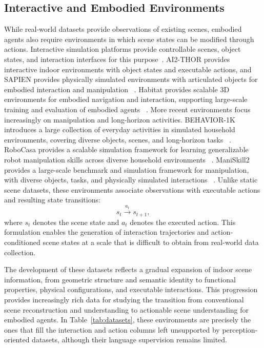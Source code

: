 \documentclass{SCIS2026}
\begin{document}
\subsection{Interactive and Embodied Environments}
\label{subsec:interactive_embodied_datasets}
While real-world datasets provide observations of existing scenes, embodied agents also require environments in which scene states can be modified through actions. Interactive simulation platforms provide controllable scenes, object states, and interaction interfaces for this purpose~\cite{gan2021threedworld,li2020igibson}. AI2-THOR provides interactive indoor environments with object states and executable actions, and SAPIEN provides physically simulated environments with articulated objects for embodied interaction and manipulation
~\cite{kolve2017ai2,xiang2020sapien}. Habitat provides scalable 3D environments for embodied navigation and interaction, supporting large-scale training and evaluation of embodied agents ~\cite{savva2019habitat,szot2021habitat}. More recent environments focus increasingly on manipulation and long-horizon activities. BEHAVIOR-1K introduces a large collection of everyday activities
in simulated household environments, covering diverse objects, scenes, and long-horizon tasks ~\cite{li2023behavior}. RoboCasa provides a scalable simulation framework for learning generalizable robot manipulation skills across diverse household environments ~\cite{nasiriany2024robocasa}. ManiSkill2 provides a large-scale benchmark and simulation framework for manipulation, with diverse objects, tasks, and physically simulated interactions ~\cite{gu2023maniskill2}. Unlike static scene datasets, these environments associate observations with executable actions and resulting state transitions:
\begin{equation}
s_t \xrightarrow{a_t} s_{t+1},
\label{eq:state_transition}
\end{equation}
where $s_t$ denotes the scene state and $a_t$ denotes the executed action. This formulation enables the generation of interaction trajectories and action-conditioned scene states at a scale that is difficult to obtain from real-world data collection.

The development of these datasets reflects a gradual expansion of indoor scene information, from geometric structure and semantic identity to functional properties, physical configurations, and executable interactions. This progression provides increasingly rich data for studying the transition from conventional scene reconstruction and understanding to actionable scene understanding for embodied agents. In Table~\ref{tab:datasets}, these environments are precisely the ones that fill the interaction and action columns left unsupported by perception-oriented datasets, although their language supervision remains limited.
\end{document}
